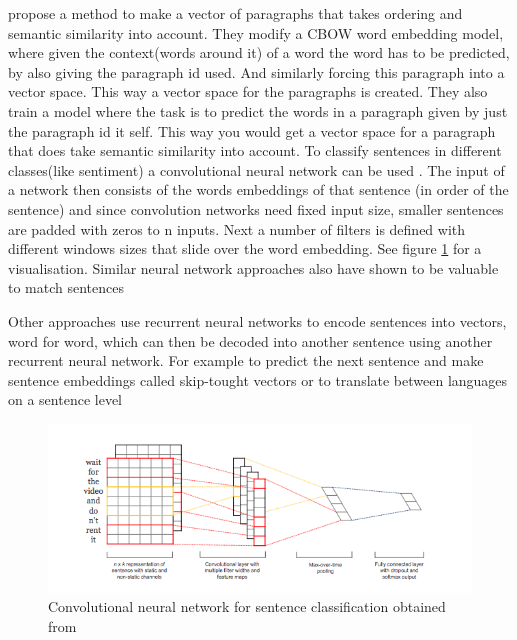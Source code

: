 \documentclass[a4paper]{scrartcl}
\begin{document}
 propose a method to make a vector of paragraphs that takes ordering and semantic similarity into account. They modify a CBOW word embedding model, where given the context(words around it) of a word the word has to be predicted, by also giving the paragraph id used. And similarly forcing this paragraph into a vector space. This way a vector space for the paragraphs is created. They also train a model where the task is to predict the words in a paragraph given by just the paragraph id it self. This way you would get a vector space for a paragraph that does take semantic similarity into account.  
To classify sentences in different classes(like sentiment) a convolutional neural network can be used \cite{kim2014convolutional}. The input of a network then consists of the words embeddings of that sentence (in order of the sentence) and since convolution networks need fixed input size, smaller sentences are padded with zeros to n inputs. Next a number of filters is defined with different windows sizes that slide over the word embedding. See figure \ref{fig:conv-sen} for a visualisation. Similar  neural network approaches also have shown to be valuable to match sentences \cite{hu2014convolutional}

Other approaches use recurrent neural networks to encode sentences into vectors, word for word, which can then be decoded into another sentence using another recurrent neural network. For example to predict the next sentence and make sentence embeddings called skip-tought vectors \cite{kiros2015skip} or to translate between languages on a sentence level \cite{sutskever2014sequence}
\begin{figure}[h]
\includegraphics[scale=.7]{sentence-cnn.png}
\caption{Convolutional neural network for sentence classification obtained from \cite{kim2014convolutional}}
\label{fig:conv-sen}
\end{figure}
\end{document}
